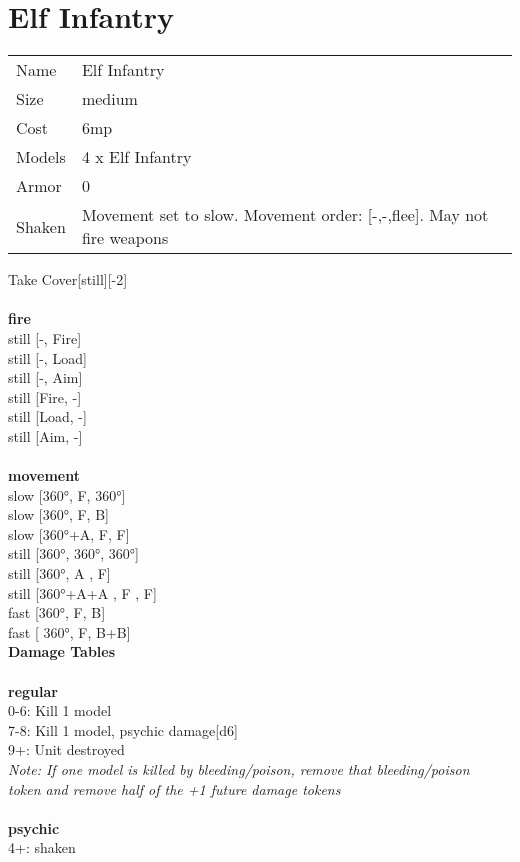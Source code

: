 \clearpage

\section{ Elf Infantry }

\begin{tabular}{ll}
  Name & Elf Infantry \\
  Size & medium\\
  Cost & 6mp\\
  Models & 4 x Elf Infantry\\
  Armor & 0\\
  Shaken & Movement set to slow. Movement order: [-,-,flee]. May not fire weapons\\
\end{tabular}

\noindent Take Cover[still][-2]\\ 


\ \\ {\bf fire } \\
still [-, Fire] \\
still [-, Load] \\
still [-, Aim] \\
still [Fire, -] \\
still [Load, -] \\
still [Aim, -] \\
\ \\ {\bf movement } \\
slow [360°, F, 360°] \\
slow [360°, F, B] \\
slow [360°+A, F, F] \\
still [360°, 360°, 360°] \\
still [360°, A , F] \\
still [360°+A+A , F , F] \\
fast [360°, F, B] \\
fast [ 360°,  F, B+B] \\


{\bf Damage Tables} \\
\ \\ {\bf regular } \\
0-6: Kill 1 model \\
7-8: Kill 1 model, psychic damage[d6] \\
9+: Unit destroyed \\
{{\it Note: If one model is killed by bleeding/poison, remove that bleeding/poison \\ token and remove half of the +1 future damage tokens}} \\
\ \\ {\bf psychic } \\
4+: shaken \\


